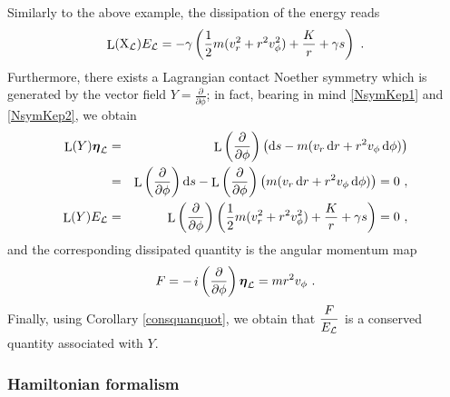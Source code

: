 \documentclass[12pt]{report}
\def\beann{\begin{eqnarray*}}
\def\eeann{\end{eqnarray*}}
\def\dst{\displaystyle}
\def\derpar#1#2{\frac{\partial{#1}}{\partial{#2}}}
\def\Lag{{\cal L}}
\def\d{{\rm d}}
\def\bmeta{\mbox{\boldmath $\eta$}}
\def\X{{\rm X}}
\def\Lie{\mathop{\rm L}\nolimits}
\def\inn{\mathop{i}\nolimits}
\begin{document}
Similarly to the above example,
the dissipation of the energy reads
$$
\Lie(\X_\Lag)E_\Lag=-\gamma \left(\frac{1}{2}m(v_r^2+r^2v_\phi^2)+\frac{K}{r}+\gamma s\right)\ .
$$
Furthermore, there exists a Lagrangian contact Noether symmetry 
which is generated by the vector field $\dst Y=\derpar{}{\phi}$; in fact,
bearing in mind \eqref{NsymKep1} and \eqref{NsymKep2}, we obtain
\beann
\Lie(Y)\bmeta_\Lag&=& 
\Lie\left(\derpar{}{\phi}\right)\left(\d s-m(v_r\,\d r+r^2v_\phi\,\d\phi)\right) \\ &=&
\Lie\left(\derpar{}{\phi}\right)\d s-
\Lie\left(\derpar{}{\phi}\right)\left(m(v_r\,\d r+r^2v_\phi\,\d\phi)\right)=0 \ , 
\\
\Lie(Y)E_\Lag&=& 
\Lie\left(\derpar{}{\phi}\right)\left(\frac{1}{2}m(v_r^2+r^2v_\phi^2)+\frac{K}{r}+\gamma s\right)=0 \ ,
\eeann
and the corresponding dissipated quantity is the
angular momentum map
$$
F=-\inn\left(\derpar{}{\phi}\right)\bmeta_\Lag=mr^2v_\phi \ .
$$
Finally, using Corollary \ref{consquanquot},
we obtain that $\dst\frac{F}{E_\Lag}$ is a conserved quantity associated with $Y$.

\subsubsection{Hamiltonian formalism}
\end{document}
